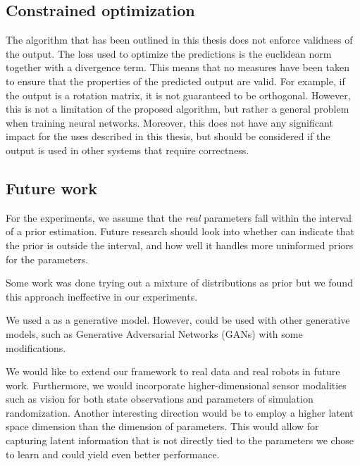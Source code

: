 \subsection{Constrained optimization}

The \dettostoc{} algorithm that has been outlined in this thesis does not enforce validness of the output. The loss used to optimize the predictions is the euclidean norm together with a divergence term. This means that no measures have been taken to ensure that the properties of the predicted output are valid. For example, if the output is a rotation matrix, it is not guaranteed to be orthogonal. However, this is not a limitation of the proposed \dettostoc{} algorithm, but rather a general problem when training neural networks. Moreover, this does not have any significant impact for the uses described in this thesis, but should be considered if the output is used in other systems that require correctness. %

\subsection{Future work}

For the experiments, we assume that the \textit{real} parameters fall within the interval of a prior estimation. Future research should look into whether \dettostoc{} can indicate that the prior is outside the interval, and how well it handles more uninformed priors for the parameters.

Some work was done trying out a mixture of distributions as prior \parencite{DBLP:journals/corr/DilokthanakulMG16} but we found this approach ineffective in our experiments.

We used a \cvae{} as a generative model. However, \dettostoc{} could be used with other generative models, such as Generative Adversarial Networks (GANs) \parencite{goodfellow2014} with some modifications.

We would like to extend our framework to real data and real robots in future work. Furthermore, we would incorporate higher-dimensional sensor modalities such as vision for both state observations and parameters of simulation randomization.
Another interesting direction would be to employ a higher latent space dimension than the dimension of parameters. This would allow for capturing latent information that is not directly tied to the parameters we chose to learn and could yield even better performance.